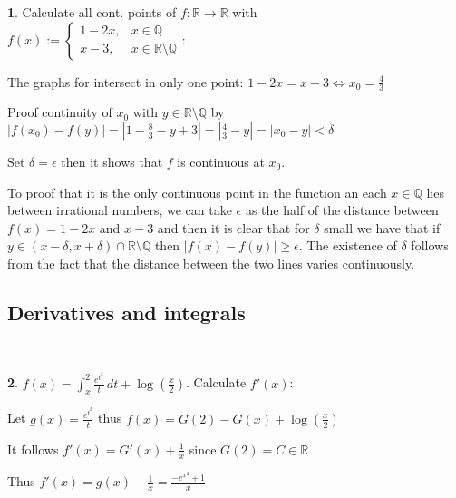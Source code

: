 \documentclass[a4paper, 10pt]{article}
\theoremstyle{definition}
\theoremstyle{ex}
\newtheorem*{exercise}{}
\theoremstyle{named}
\newcommand{\R}{\mathbb{R}}
\newcommand{\Q}{\mathbb{Q}}
\begin{document}
\begin{exercise}
    Calculate all cont. points of $f: \R \to \R$ with \\
    $f(x) := \begin{cases}
        1 - 2x, & x \in \Q \\
        x - 3, & x \in \R \setminus \Q
    \end{cases}$:
    \begin{exanswers}
        \item The graphs for intersect in only one point: $1 - 2x = x - 3 \iff x_0 = \frac{4}{3}$
        \item Proof continuity of $x_0$ with $y \in \R \setminus \Q$ by $|f(x_0) - f(y)| = |1 - \frac{8}{3} - y + 3| = |\frac{4}{3} - y| = |x_0 - y| < \delta$
        \item Set $\delta = \epsilon$ then it shows that $f$ is continuous at $x_0$.
        \item To proof that it is the only continuous point in the function an each $x \in \Q$ lies between irrational numbers, we can take $\epsilon$ as the half of the distance between $f(x) = 1-2x$ and $x-3$ and then it is clear that for $\delta$ small we have that if $y \in (x - \delta, x + \delta) \cap \R \setminus \Q$ then $|f(x) - f(y)| \geq \epsilon$. The existence of $\delta$ follows from the fact that the distance between the two lines varies continuously.
    \end{exanswers}
\end{exercise}

\subsection*{Derivatives and integrals}\
\begin{exercise}
    $f(x) = \int_x^2 \frac{e^{t^2}}{t}\,dt + \log(\frac{x}{2})$. Calculate $f'(x)$:
    \begin{exanswers}
        \item Let $g(x) = \frac{e^{t^2}}{t}$ thus $f(x) = G(2) - G(x) + \log(\frac{x}{2})$
        \item It follows $f'(x) = G'(x) + \frac{1}{x}$ since $G(2) = C \in \R$
        \item Thus $f'(x) = g(x) - \frac{1}{x} = \frac{-e^{x^2} + 1}{x}$
    \end{exanswers}
\end{exercise}
\end{document}
